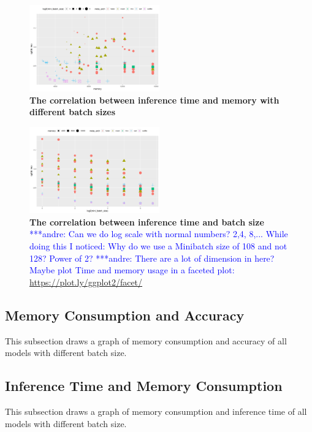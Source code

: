\documentclass[conference]{IEEEtran}
\newcommand{\alnote}[1]{ {\textcolor{blue} { ***andre: #1 }}}
\newcommand{\alnote}[1]{}
\begin{document}
\begin{figure}[htpb]
	  \centering
	  \includegraphics[width=0.5\textwidth]{RunningTimeVSMemory-Batch}
	  \caption{\textbf{The correlation between inference time and memory with different batch sizes}}
	  \label{fig:running-memory-batch}
\end{figure}

\begin{figure}[htpb]
	  \centering
	  \includegraphics[width=0.5\textwidth]{RunningTimeVSBatch}
	  \caption{\textbf{The correlation between inference time and batch size}\alnote{Can we do log scale with normal numbers? 2,4, 8,... While doing this I noticed: Why do we use a Minibatch size of 108 and not 128? Power of 2?} \alnote{There are a lot of dimension in here? Maybe plot Time and memory usage in a faceted plot: \url{https://plot.ly/ggplot2/facet/}}}
	  \label{fig:running-batch2}
\end{figure}

\subsection{Memory Consumption and Accuracy}
This subsection draws a graph of memory consumption and accuracy of all models with different batch size.

\subsection{Inference Time and Memory Consumption}
This subsection draws a graph of memory consumption and inference time of all models with different batch size.
\end{document}

